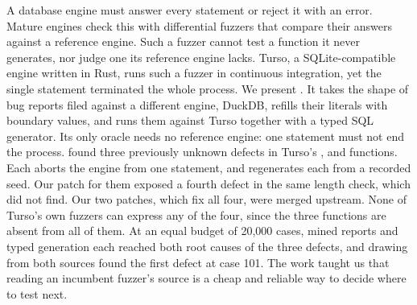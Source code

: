 A database engine must answer every statement or reject it with an error. Mature
engines check this with differential fuzzers that compare their answers against
a reference engine. Such a fuzzer cannot test a function it never generates, nor
judge one its reference engine lacks. Turso, a SQLite-compatible engine written
in Rust, runs such a fuzzer in continuous integration, yet the single statement
 terminated the whole process.
We present \tool. It takes the shape of bug reports filed against a different
engine, DuckDB, refills their literals with boundary values, and runs them
against Turso together with a typed SQL generator. Its only oracle needs no
reference engine: one statement must not end the process. \tool found three
previously unknown defects in Turso's ,  and 
functions. Each aborts the engine from one statement, and \tool regenerates each
from a recorded seed. Our patch for them exposed a fourth defect in the same
length check, which \tool did not find. Our two patches, which fix all four,
were merged upstream. None of Turso's own fuzzers can express any of the four,
since the three functions are absent from all of them. At an equal budget of
20{,}000 cases, mined reports and typed generation each reached both root causes
of the three defects, and drawing from both sources found the first defect at
case 101. The work taught us that reading an incumbent fuzzer's source is a cheap
and reliable way to decide where to test next.
